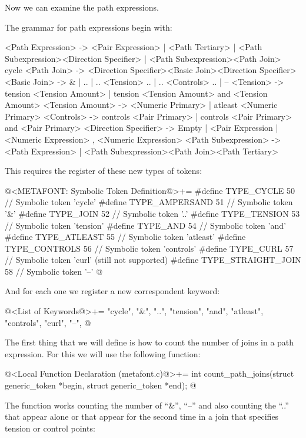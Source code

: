 Now we can examine the path expressions.


The grammar for path expressions begin with:

\alinhaverbatim
<Path Expression> -> <Pair Expression> | <Path Tertiary> |
                     <Path Subexpression><Direction Specifier> |
                     <Path Subexpression><Path Join> cycle
<Path Join> -> <Direction Specifier><Basic Join><Direction Specifier>
<Basic Join> -> & | .. | .. <Tension> .. | .. <Controls> .. | --
<Tension> -> tension <Tension Amount> |
             tension <Tension Amount> and <Tension Amount>
<Tension Amount> -> <Numeric Primary> | atleast <Numeric Primary>
<Controls> -> controls <Pair Primary> |
              controls <Pair Primary> and <Pair Primary>
<Direction Specifier> -> Empty |
                         { <Pair Expression } |
                         { <Numeric Expression> , <Numeric Expression> }
<Path Subexpression> -> <Path Expression> |
                        <Path Subexpression><Path Join><Path Tertiary>
\alinhanormal

This requires the register of these new types of tokens:

\iniciocodigo
@<METAFONT: Symbolic Token Definition@>+=
#define TYPE_CYCLE          50 // Symbolic token 'cycle'
#define TYPE_AMPERSAND      51 // Symbolic token '&'
#define TYPE_JOIN           52 // Symbolic token '..'
#define TYPE_TENSION        53 // Symbolic token 'tension'
#define TYPE_AND            54 // Symbolic token 'and'
#define TYPE_ATLEAST        55 // Symbolic token 'atleast'
#define TYPE_CONTROLS       56 // Symbolic token 'controls'
#define TYPE_CURL           57 // Symbolic token 'curl' (still not supported)
#define TYPE_STRAIGHT_JOIN   58 // Symbolic token '--'
@
\fimcodigo

And for each one we register a new correspondent keyword:

\iniciocodigo
@<List of Keywords@>+=
"cycle", "&", "..", "tension", "and", "atleast", "controls", "curl", "--",
@
\fimcodigo

The first thing that we will define is how to count the number of
joins in a path expression. For this we will use the following
function:

\iniciocodigo
@<Local Function Declaration (metafont.c)@>+=
int count_path_joins(struct generic_token *begin, struct generic_token *end);
@
\fimcodigo

The function works counting the number of ``\&'', ``--'' and also
counting the ``..'' that appear alone or that appear for the second
time in a join that specifies tension or control points:

